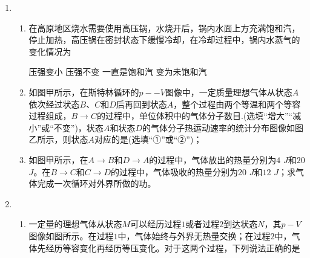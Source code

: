 \begin{enumerate}[leftmargin=0em]
\begin{enumerate}
\end{enumerate}

\newpage
\item 
{}
\begin{enumerate}
\renewcommand{\labelenumii}{(\arabic{enumii})}

\item 
在高原地区烧水需要使用高压锅，水烧开后，锅内水面上方充满饱和汽，停止加热，高压锅在密封状态下缓慢冷却，在冷却过程中，锅内水蒸气的变化情况为  

\fourchoices
{压强变小}
{压强不变}
{一直是饱和汽}
{变为未饱和汽}


\item 
如图甲所示，在斯特林循环的$ p -- V $图像中，一定质量理想气体从状态$ A $依次经过状态$ B $、$ C $和$ D $后再回到状态$ A $，整个过程由两个等温和两个等容过程组成，$ B \rightarrow C $的过程中，单位体积中的气体分子数目.(选填“增大”“减小”或“不变”)，状态$ A $和状态$ D $的气体分子热运动速率的统计分布图像如图乙所示，则状态$ A $对应的是(选填“①”或“②”)；
\begin{figure}[h!]
\centering

\end{figure}

\item 
如图甲所示，在$ A \rightarrow B $和$ D \rightarrow A $的过程中，气体放出的热量分别为$ 4 $ $ J $和$ 20 $ $ J $。在$ B \rightarrow C $和$ C \rightarrow D $的过程中，气体吸收的热量分别为$ 20 $ $ J $和$ 12 $ $ J $；求气体完成一次循环对外界所做的功。



\end{enumerate}



\newpage
\item 
{}
\begin{enumerate}
\renewcommand{\labelenumi}{\arabic{enumi}.}
\item
一定量的理想气体从状态$ M $可以经历过程$ 1 $或者过程$ 2 $到达状态$ N $，其$ p-V $图像如图所示。在过程$ 1 $中，气体始终与外界无热量交换；在过程$ 2 $中，气体先经历等容变化再经历等压变化。对于这两个过程，下列说法正确的是  
\begin{figure}[h!]
\centering

\end{figure}


\end{enumerate}
\end{enumerate}
